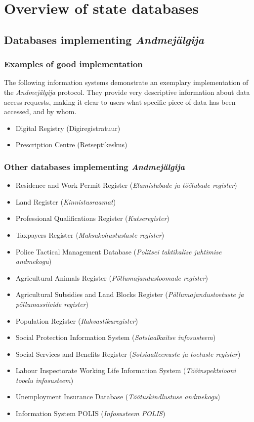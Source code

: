 \section{Overview of state databases} \label{Overview of state databases}

\subsection{Databases implementing \textit{Andmejälgija}}

\subsubsection{Examples of good implementation}
The following information systems demonstrate an exemplary implementation of the \textit{Andmejälgija} protocol. They provide very descriptive information about data access requests, making it clear to users what specific piece of data has been accessed, and by whom. 

\begin{itemize}
    \item Digital Registry (Digiregistratuur)
    \item Prescription Centre (Retseptikeskus)
\end{itemize}

\subsubsection{Other databases implementing \textit{Andmejälgija}}
\begin{itemize}
    \item Residence and Work Permit Register (\textit{Elamislubade ja töölubade register})
    \item Land Register (\textit{Kinnistusraamat})
    \item Professional Qualifications Register (\textit{Kutseregister})
    \item Taxpayers Register (\textit{Maksukohustuslaste register})
    \item Police Tactical Management Database (\textit{Politsei taktikalise juhtimise andmekogu})
    \item Agricultural Animals Register (\textit{Põllumajandusloomade register})
    \item Agricultural Subsidies and Land Blocks Register (\textit{Põllumajandustoetuste ja põllumassiivide register})
    \item Population Register (\textit{Rahvastikuregister})
    \item Social Protection Information System (\textit{Sotsiaalkaitse infosusteem})
    \item Social Services and Benefits Register (\textit{Sotsiaalteenuste ja toetuste register})
    \item Labour Inspectorate Working Life Information System (\textit{Tööinspektsiooni tooelu infosusteem})
    \item Unemployment Insurance Database (\textit{Töötuskindlustuse andmekogu})
    \item Information System POLIS (\textit{Infosusteem POLIS})
\end{itemize}

